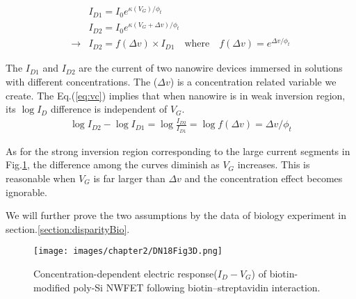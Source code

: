 \begin{align}
    & I_{D1} = I_{0} e^{\kappa(V_{G}) / \phi_t} \\
    & I_{D2} = I_{0} e^{\kappa(V_{G} + \Delta v) / \phi_t} \\
    \rightarrow & I_{D2} = f(\Delta v) \times I_{D1} \quad \text{where} \quad f(\Delta v) = e^{\Delta v / \phi_t} \label{eq:vc}
\end{align}

The $I_{D1}$ and $I_{D2}$ are the current of two nanowire devices immersed in solutions with different concentrations.
The ($\Delta v$) is a concentration related variable we create.
The Eq.(\ref{eq:vc}) implies that when nanowire is in weak inversion region, its $\log I_D$ difference is independent of $V_G$.
\begin{align}
    \log I_{D2} - \log I_{D1} = \log \frac{I_{D2}}{I_{D1}} = \log f(\Delta v) = \Delta v / \phi_t
\end{align}

As for the strong inversion region corresponding to the large current segments in Fig.\ref{fig:DN17Fig6d}, the difference among the curves diminish as $V_G$ increases.
This is reasonable when $V_{G}$ is far larger than $\Delta v$ and the concentration effect becomes ignorable.

We will further prove the two assumptions by the data of biology experiment in section.\ref{section:disparityBio}.

\begin{figure}[!htbp]
    \centering
    \texttt{[image: images/chapter2/DN18Fig3D.png]}
    \caption{Concentration-dependent electric response($I_D-V_G$) of biotin-modified poly-Si NWFET following biotin–streptavidin interaction.\cite{DN17}}
    \label{fig:DN17Fig6d}
\end{figure}










%
